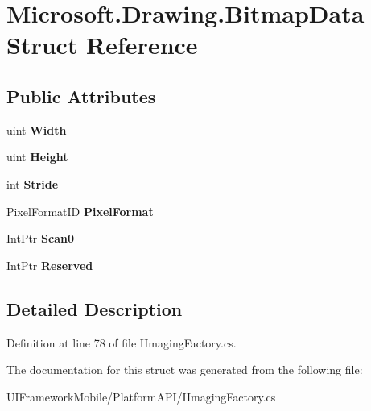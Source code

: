 \hypertarget{struct_microsoft_1_1_drawing_1_1_bitmap_data}{
\section{Microsoft.Drawing.BitmapData Struct Reference}
\label{struct_microsoft_1_1_drawing_1_1_bitmap_data}
}
\subsection*{Public Attributes}
\begin{DoxyCompactItemize}
\item 
\hypertarget{struct_microsoft_1_1_drawing_1_1_bitmap_data_a205b08f4b638dc7aa4f2b4bafa71e94c}{
uint {\bfseries Width}}
\label{struct_microsoft_1_1_drawing_1_1_bitmap_data_a205b08f4b638dc7aa4f2b4bafa71e94c}

\item 
\hypertarget{struct_microsoft_1_1_drawing_1_1_bitmap_data_a85a5c70d00b3d809cf1050b93b9e22ca}{
uint {\bfseries Height}}
\label{struct_microsoft_1_1_drawing_1_1_bitmap_data_a85a5c70d00b3d809cf1050b93b9e22ca}

\item 
\hypertarget{struct_microsoft_1_1_drawing_1_1_bitmap_data_a5d641809d55a4b95643c11b2b663e0ab}{
int {\bfseries Stride}}
\label{struct_microsoft_1_1_drawing_1_1_bitmap_data_a5d641809d55a4b95643c11b2b663e0ab}

\item 
\hypertarget{struct_microsoft_1_1_drawing_1_1_bitmap_data_a406788dc8e68efd7d398512f6f2cb885}{
PixelFormatID {\bfseries PixelFormat}}
\label{struct_microsoft_1_1_drawing_1_1_bitmap_data_a406788dc8e68efd7d398512f6f2cb885}

\item 
\hypertarget{struct_microsoft_1_1_drawing_1_1_bitmap_data_aa266046040a805f305906f5c78debf84}{
IntPtr {\bfseries Scan0}}
\label{struct_microsoft_1_1_drawing_1_1_bitmap_data_aa266046040a805f305906f5c78debf84}

\item 
\hypertarget{struct_microsoft_1_1_drawing_1_1_bitmap_data_a87ad8ae88443621624b2032e2519a21d}{
IntPtr {\bfseries Reserved}}
\label{struct_microsoft_1_1_drawing_1_1_bitmap_data_a87ad8ae88443621624b2032e2519a21d}

\end{DoxyCompactItemize}


\subsection{Detailed Description}


Definition at line 78 of file IImagingFactory.cs.

The documentation for this struct was generated from the following file:\begin{DoxyCompactItemize}
\item 
UIFrameworkMobile/PlatformAPI/IImagingFactory.cs\end{DoxyCompactItemize}
